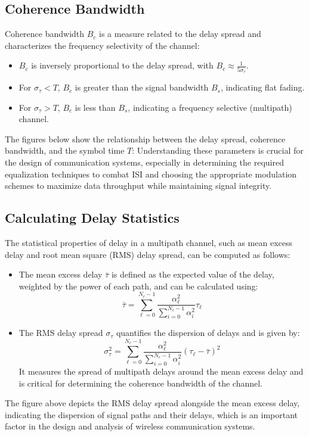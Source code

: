\subsection*{Coherence Bandwidth}

Coherence bandwidth \( B_c \) is a measure related to the delay spread and characterizes the frequency selectivity of the channel:

\begin{itemize}
    \item \( B_c \) is inversely proportional to the delay spread, with \( B_c \approx \frac{1}{5\sigma_{\tau}} \).
    \item For \( \sigma_{\tau} < T \), \( B_c \) is greater than the signal bandwidth \( B_s \), indicating flat fading.
    \item For \( \sigma_{\tau} > T \), \( B_c \) is less than \( B_s \), indicating a frequency selective (multipath) channel.
\end{itemize}

The figures below show the relationship between the delay spread, coherence bandwidth, and the symbol time \( T \):
Understanding these parameters is crucial for the design of communication systems, especially in determining the required equalization techniques to combat ISI and choosing the appropriate modulation schemes to maximize data throughput while maintaining signal integrity.

\subsection*{Calculating Delay Statistics}

The statistical properties of delay in a multipath channel, such as mean excess delay and root mean square (RMS) delay spread, can be computed as follows:

\begin{itemize}
    \item The mean excess delay \( \bar{\tau} \) is defined as the expected value of the delay, weighted by the power of each path, and can be calculated using:
    \[
    \bar{\tau} = \sum_{\ell=0}^{N_c-1} \frac{\alpha_{\ell}^2}{\sum_{i=0}^{N_c-1} \alpha_{i}^2} \tau_{\ell}
    \]
    
    \item The RMS delay spread \( \sigma_{\tau} \) quantifies the dispersion of delays and is given by:
    \[
    \sigma_{\tau}^2 = \sum_{\ell=0}^{N_c-1} \frac{\alpha_{\ell}^2}{\sum_{i=0}^{N_c-1} \alpha_{i}^2} (\tau_{\ell} - \bar{\tau})^2
    \]
    It measures the spread of multipath delays around the mean excess delay and is critical for determining the coherence bandwidth of the channel.
\end{itemize}
The figure above depicts the RMS delay spread alongside the mean excess delay, indicating the dispersion of signal paths and their delays, which is an important factor in the design and analysis of wireless communication systems.


